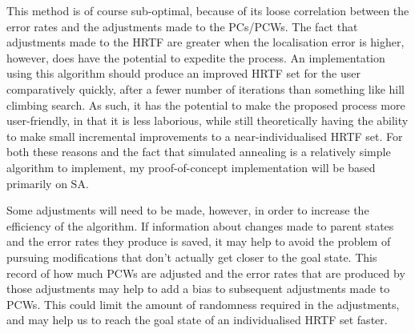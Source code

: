 This method is of course sub-optimal, because of its loose correlation between the error rates and the adjustments made to the PCs/PCWs. The fact that adjustments made to the HRTF are greater when the localisation error is higher, however, does have the potential to expedite the process. An implementation using this algorithm should produce an improved HRTF set for the user comparatively quickly, after a fewer number of iterations than something like hill climbing search. As such, it has the potential to make the proposed process more user-friendly, in that it is less laborious, while still theoretically having the ability to make small incremental improvements to a near-individualised HRTF set. For both these reasons and the fact that simulated annealing is a relatively simple algorithm to implement, my proof-of-concept implementation will be based primarily on SA.  

Some adjustments will need to be made, however, in order to increase the efficiency of the algorithm. If information about changes made to parent states and the error rates they produce is saved, it may help to avoid the problem of pursuing modifications that don't actually get closer to the goal state. This record of how much PCWs are adjusted and the error rates that are produced by those adjustments may help to add a bias to subsequent adjustments made to PCWs. This could limit the amount of randomness required in the adjustments, and may help us to reach the goal state of an individualised HRTF set faster. 